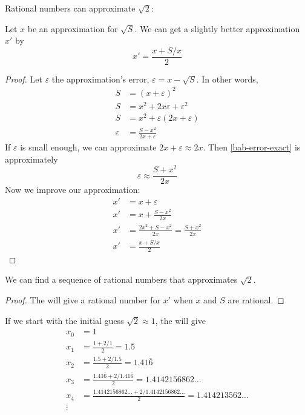 \message{ !name(truth.tex)}\documentclass{scrbook}
\begin{document}
Rational numbers can approximate $\sqrt 2$:
\begin{theorem}
  \label{th:babylon}
  Let $x$ be an approximation for $\sqrt S$. We can get a slightly better approximation $x'$ by
  \[
  x'=\frac{x+S/x}{2}
  \]
\end{theorem}
\begin{proof}
Let $\varepsilon$ the approximation's error, \ie $\varepsilon = x-\sqrt S$.
  In other words,
  \begin{align}
    S &= (x+\varepsilon)^2 \nonumber\\
    S &= x^2+2x\varepsilon + \varepsilon^2 \nonumber\\
    S&= x^2+\varepsilon(2x+\varepsilon) \nonumber\\
    \varepsilon &= \frac{S-x^2}{2x+\varepsilon}\label{bab-error-exact}
  \end{align}
  If $\varepsilon$ is small enough, we can approximate $2x+\varepsilon \approx 2x$. Then \cref{bab-error-exact} is approximately
  \[
  \varepsilon \approx \frac {S+x^2}{2x}
  \]
  Now we improve our approximation:
  \begin{align*}
    x' &= x+\varepsilon \\
    x' &= x+ \frac{S-x^2}{2x} \\
    x' &= \frac{2x^2+S-x^2}{2x}=\frac{S+x^2}{2x} \\
    x' &= \frac{x+S/x}{2}
  \end{align*}
\end{proof}
\begin{cor}
  We can find a sequence of rational numbers that approximates $\sqrt{2}$.
\end{cor}
\begin{proof}
The  will give a rational number for $x'$ when $x$ and $S$ are rational. 
\end{proof}
\begin{example}
  If we start with the initial guess $\sqrt 2 \approx 1$, the  will give 
  \begin{align*}
    x_0&=1 \\
    x_1 &= \frac{1+2/1}2 = 1.5 \\
    x_2 &= \frac{1.5+2/1.5}2 = 1.41\bar6 \\
    x_3 &= \frac{1.41\bar6 +2/1.41\bar6}2 = 1.4142156862\dots \\
    x_4 &= \frac{1.4142156862\ldots+2/1.4142156862\dots}2 = 1.414213562\dots \\
        \vdots
  \end{align*}
\end{example}
\end{document}
